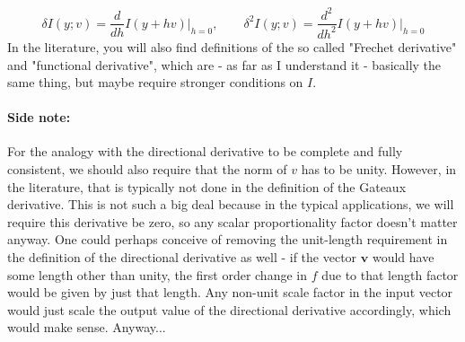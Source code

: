 \begin{equation}
 \delta   I(y; v) = \frac{d}  {d h  } I(y + h v) \bigg\rvert_{h=0}, \qquad
 \delta^2 I(y; v) = \frac{d^2}{d h^2} I(y + h v) \bigg\rvert_{h=0}
\end{equation}
In the literature, you will also find definitions of the so called "Frechet derivative" and "functional derivative", which are - as far as I understand it - basically the same thing, but maybe require stronger conditions on $I$.


\paragraph{Side note:} For the analogy with the directional derivative to be complete and fully consistent, we should also require that the norm of $v$ has to be unity. However, in the literature, that is typically not done in the definition of the Gateaux derivative. This is not such a big deal because in the typical applications, we will require this derivative be zero, so any scalar proportionality factor doesn't matter anyway. One could perhaps conceive of removing the unit-length requirement in the definition of the directional derivative as well - if the vector $\mathbf{v}$ would have some length other than unity, the first order change in $f$ due to that length factor would be given by just that length. Any non-unit scale factor in the input vector would just scale the output value of the directional derivative accordingly, which would make sense. Anyway...





